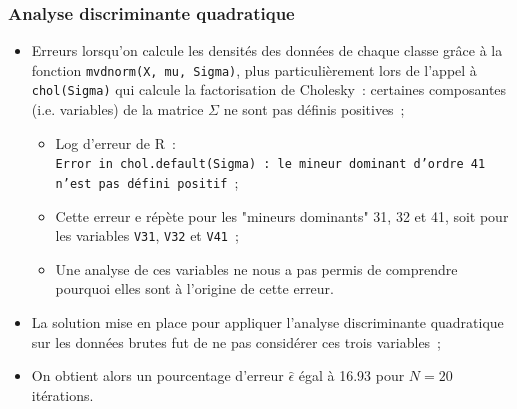 \documentclass[a4paper,10pt]{report}
\begin{document}
\subsubsection{Analyse discriminante quadratique}
\begin{itemize}
	\item Erreurs lorsqu'on calcule les densités des données de chaque classe grâce à la fonction \texttt{mvdnorm(X, mu, Sigma)}, plus particulièrement lors de l'appel à \texttt{chol(Sigma)} qui calcule la factorisation de Cholesky~: certaines composantes (i.e. variables) de la matrice $\Sigma$ ne sont pas définis positives~;
	\begin{itemize}
		\item Log d'erreur de R~:\\
		\texttt{Error in chol.default(Sigma) : le mineur dominant d'ordre 41 n'est pas défini positif}~;
		\item Cette erreur e répète pour les "mineurs dominants" 31, 32 et 41, soit pour les variables \texttt{V31}, \texttt{V32} et \texttt{V41}~;
		\item Une analyse de ces variables ne nous a pas permis de comprendre pourquoi elles sont à l'origine de cette erreur.
	\end{itemize}
	\item La solution mise en place pour appliquer l'analyse discriminante quadratique sur les données brutes fut de ne pas considérer ces trois variables~;
	\item On obtient alors un pourcentage d'erreur $\hat{\epsilon}$ égal à 16.93 pour $N = 20$ itérations.
\end{itemize}
\end{document}
